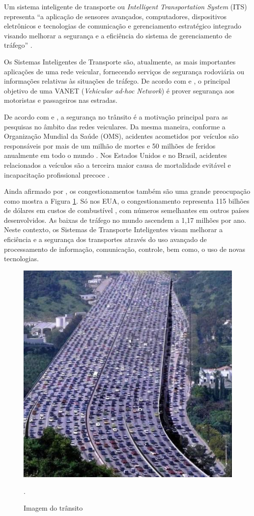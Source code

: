 \documentclass[
	12pt,				%
	oneside,			%
	a4paper,			%
	english,			%
	brazil				%
	]{abntex2ppgsi}
\begin{document}
Um sistema inteligente de transporte ou \textit{Intelligent Transportation System} (ITS) representa ``a aplicação de sensores avançados, computadores, dispositivos eletrônicos e tecnologias de comunicação e gerenciamento estratégico integrado visando melhorar a segurança e a eficiência do sistema de gerenciamento de tráfego'' \cite{nasim2012distributed}.

Os Sistemas Inteligentes de Transporte são, atualmente,  as  mais  importantes  aplicações  de  uma  rede  veicular,  fornecendo  serviços  de segurança  rodoviária \cite{xu2003design}  ou  informações  relativas  às  situações  de  tráfego.  De acordo com   e , o principal objetivo de uma  VANET (\textit{Vehicular ad-hoc Network}) é prover segurança aos motoristas e passageiros nas estradas.

De acordo com  e , a segurança no trânsito é a motivação principal para as pesquisas no âmbito das redes veiculares.  Da mesma maneira, conforme a Organização Mundial da Saúde (OMS), acidentes acometidos por veículos são responsáveis por mais de um milhão de mortes e 50 milhões de feridos anualmente em todo o mundo \cite{peden2004world}. Nos Estados Unidos e no Brasil, acidentes relacionados a veículos são  a terceira maior causa de mortalidade evitável e incapacitação profissional precoce \cite{systematics2011crashes} \cite{el2007systematic}. 

Ainda afirmado por  , os congestionamentos também são uma grande preocupação como mostra a Figura \ref{fig:transito}.  Só nos EUA, o congestionamento representa 115 bilhões de dólares em custos de combustível \cite{TTI}, com números semelhantes em outros países desenvolvidos. As baixas de tráfego no mundo ascendem a 1,17 milhões por ano. Neste contexto, os Sistemas de Transporte Inteligentes visam melhorar a eficiência e a segurança dos transportes através do uso avançado de processamento de informação, comunicação, controle, bem como, o uso de novas tecnologias.

\begin{figure}[h!]
	\centering
	\includegraphics[width=0.7\columnwidth]{images/transito2.jpeg}
	\caption{Imagem do trânsito \cite{autoentusiastasclassic}}.
	\label{fig:transito}
\end{figure}
\end{document}
